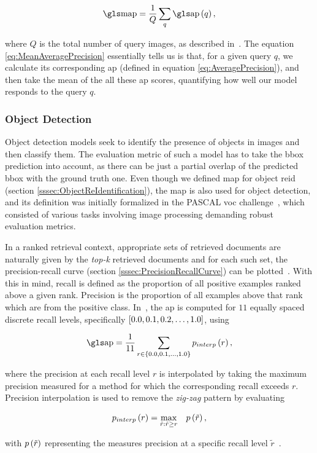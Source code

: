 \begin{equation}
    \label{eq:MeanAveragePrecision}
    \MAP = \frac{1}{Q} \sum_q \func{\AP}{q},
\end{equation}

\noindent where $Q$ is the total number of query images, as described in~\cite{Kuma2019}. The equation \ref{eq:MeanAveragePrecision} essentially tells us is that, for a given query $q$, we calculate its corresponding \gls{ap} (defined in equation \ref{eq:AveragePrecision}), and then take the mean of the all these \gls{ap} scores, quantifying how well our model responds to the query $q$.

\subsubsection{Object Detection}

Object detection models seek to identify the presence of objects in images and then classify them. The evaluation metric of such a model has to take the \gls{bbox} prediction into account, as there can be just a partial overlap of the predicted \gls{bbox} with the ground truth one. Even though we defined \gls{map} for object \gls{reid} (section \ref{sssec:ObjectReIdentification}), the \gls{map} is also used for object detection, and its definition was initially formalized in the PASCAL \gls{voc} challenge~\cite{Everingham10}, which consisted of various tasks involving image processing demanding robust evaluation metrics.

In a ranked retrieval context, appropriate sets of retrieved documents are naturally given by the \emph{top-k} retrieved documents and for each such set, the precision-recall curve (section \ref{sssec:PrecisionRecallCurve}) can be plotted~\cite{salton_introduction_1983}. With this in mind, recall is defined as the proportion of all positive examples ranked above a given rank. Precision is the proportion of all examples above that rank which are from the positive class. In~\cite{Everingham10}, the \gls{ap} is computed for $11$ equally spaced discrete recall levels, specifically $\left[ {0.0, 0.1, 0.2, \dots, 1.0} \right]$, using

\begin{equation}
    \AP = \frac{1}{11} \sum_{r \in \cbrackets{0.0, 0.1, \dots, 1.0}} \func{p_{interp}}{r},
\end{equation}

\noindent where the precision at each recall level $r$ is interpolated by taking the maximum precision measured for a method for which the corresponding recall exceeds $r$. Precision interpolation is used to remove the \emph{zig-zag} pattern by evaluating

\begin{equation}
    {p_{interp}} \left( r \right) = \underset{\tilde{r}:\tilde{r} \geq r}{\max} \quad {p} \left( \tilde{r} \right),
\end{equation}

\noindent with ${p} \left( \tilde{r} \right)$ representing the measures precision at a specific recall level $\tilde{r}$~\cite{Everingham10, salton_introduction_1983}.
